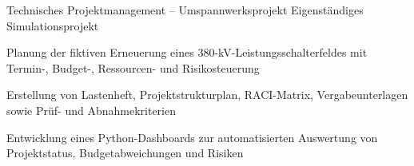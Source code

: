 \begin{rSubsection}{Technisches Projektmanagement -- Umspannwerksprojekt}
{}{Eigenständiges Simulationsprojekt}{}
\item Planung der fiktiven Erneuerung eines 380-kV-Leistungsschalterfeldes mit Termin-, Budget-, Ressourcen- und Risikosteuerung
\item Erstellung von Lastenheft, Projektstrukturplan, RACI-Matrix, Vergabeunterlagen sowie Prüf- und Abnahmekriterien
\item Entwicklung eines Python-Dashboards zur automatisierten Auswertung von Projektstatus, Budgetabweichungen und Risiken
\end{rSubsection}
